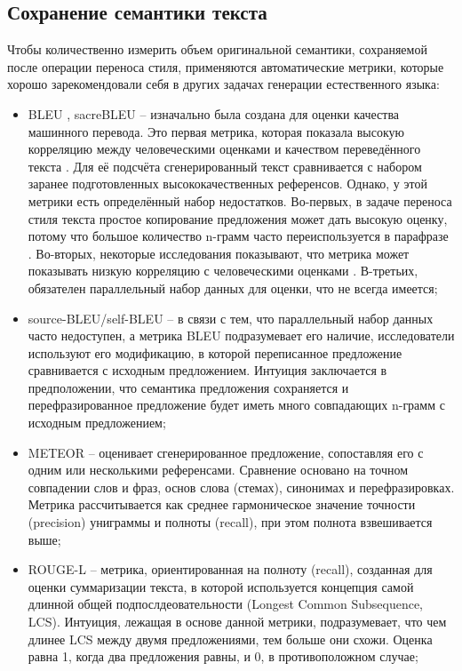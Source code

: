 \subsection{Сохранение семантики текста}
Чтобы количественно измерить объем оригинальной семантики, сохраняемой после операции переноса стиля, применяются автоматические метрики, которые хорошо зарекомендовали себя в других задачах генерации естественного языка:
\begin{itemize}
    \item BLEU \cite{bleu}, sacreBLEU \cite{sacrebleu} -- изначально была создана для оценки качества машинного перевода. Это первая метрика, которая показала высокую корреляцию между человеческими оценками и качеством переведённого текста \cite{hu2023text}.
    Для её подсчёта сгенерированный текст сравнивается с набором заранее подготовленных высококачественных референсов.
    Однако, у этой метрики есть определённый набор недостатков.
    Во-первых, в задаче переноса стиля текста простое копирование предложения может дать высокую оценку, потому что большое количество n-грамм часто переиспользуется в парафразе \cite{jin2021deep}.
    Во-вторых, некоторые исследования показывают, что метрика может показывать низкую корреляцию с человеческими оценками \cite{li2018delete, mir2019evaluating}.
    В-третьих, обязателен параллельный набор данных для оценки, что не всегда имеется;
    \item source-BLEU/self-BLEU -- в связи с тем, что параллельный набор данных часто недоступен, а метрика BLEU подразумевает его наличие, исследователи используют его модификацию, в которой переписанное предложение сравнивается с исходным предложением. Интуиция заключается в предположении, что семантика предложения сохраняется и перефразированное предложение будет иметь много совпадающих n-грамм с исходным предложением;
    \item METEOR \cite{meteor} -- оценивает сгенерированное предложение, сопоставляя его с одним или несколькими референсами. Сравнение основано на точном совпадении слов и фраз, основ слова (стемах), синонимах и перефразировках. Метрика рассчитывается как среднее гармоническое значение точности (precision) униграммы и полноты (recall), при этом полнота взвешивается выше;
    \item ROUGE-L \cite{lin-2004-rouge} -- метрика, ориентированная на полноту (recall), созданная для оценки суммаризации текста, в которой используется концепция самой длинной общей подпослдеовательности (Longest Common Subsequence, LCS). Интуиция, лежащая в основе данной метрики, подразумевает, что чем длинее LCS между двумя предложениями, тем больше они схожи. Оценка равна 1, когда два предложения равны, и 0, в противоположном случае;

\end{itemize}

